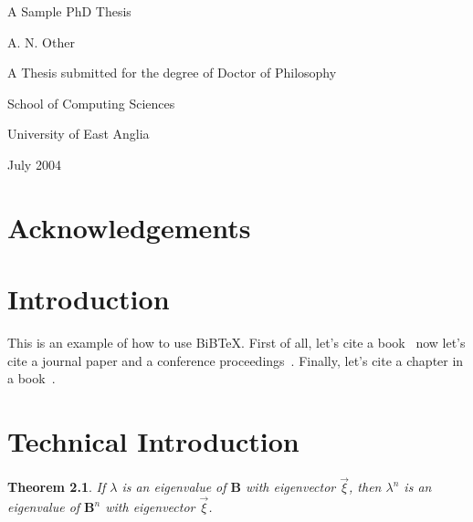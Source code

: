 \documentclass[a4paper,12pt]{report}
\newtheorem{theorem}{Theorem}
\theoremstyle{definition}
\begin{document}

\begin{titlepage}
\begin{center}
\vspace*{1in}
{\LARGE A Sample PhD Thesis}
\par
\vspace{1.5in}
{\large A. N. Other}
\par
\vfill
A Thesis submitted for the degree of Doctor of Philosophy
\par
\vspace{0.5in}
School of Computing Sciences
\par
\vspace{0.5in}
University of East Anglia
\par
\vspace{0.5in}
July 2004
\end{center}
\end{titlepage}


\renewcommand{\baselinestretch}{1.66}

\tableofcontents
\listoffigures
\listoftables

\chapter*{Acknowledgements}

\begin{abstract}
\end{abstract}


\chapter{Introduction}
\label{ch:intro}

This is an example of how to use BiB\TeX.
First of all, let's cite a book~\cite{wainwright93}
now let's cite a journal paper and a conference proceedings~\cite{cawley96,talbot97}.
Finally, let's cite a chapter in a book~\cite[Chapter 9]{goossens97}.

\chapter{Technical Introduction}
\label{ch:techintro}

\begin{theorem}
If $\lambda$ is an eigenvalue of $\mathbf{B}$ with eigenvector $\vec{\xi}$, then
$\lambda^n$ is an eigenvalue of $\mathbf{B}^n$ with eigenvector $\vec{\xi}$.
\end{theorem}
\end{document}
